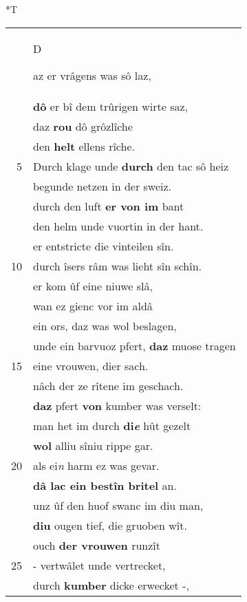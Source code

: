 \documentclass[8pt,a4paper,notitlepage]{article}
\begin{document}
\begin{table}[ht]
\begin{minipage}[t]{0.5\linewidth}
\end{minipage}
\hspace{0.5cm}
\begin{minipage}[t]{0.5\linewidth}
\small
\begin{center}*T
\end{center}
\begin{tabular}{rl}
 & \begin{large}D\end{large}az er vrâgens was sô laz,\\ 
 & \textbf{dô} er bî dem trûrigen wirte saz,\\ 
 & daz \textbf{rou} dô grôzlîche\\ 
 & den \textbf{helt} ellens rîche.\\ 
5 & Durch klage unde \textbf{durch} den tac sô heiz\\ 
 & begunde netzen in der sweiz.\\ 
 & durch den luft \textbf{er von im} bant\\ 
 & den helm unde vuortin in der hant.\\ 
 & er entstricte die vinteilen sîn.\\ 
10 & durch îsers râm was lieht sîn schîn.\\ 
 & er kom ûf eine niuwe slâ,\\ 
 & wan ez gienc vor im aldâ\\ 
 & ein ors, daz was wol beslagen,\\ 
 & unde ein barvuoz pfert, \textbf{daz} muose tragen\\ 
15 & eine vrouwen, dier sach.\\ 
 & nâch der ze rîtene im geschach.\\ 
 & \textbf{daz} pfert \textbf{von} kumber was verselt:\\ 
 & man het im durch \textbf{di\textit{e}} hût gezelt\\ 
 & \textbf{wol} alliu sîniu rippe gar.\\ 
20 & als ei\textit{n} harm ez was gevar.\\ 
 & \textbf{dâ lac ein bestîn britel} an.\\ 
 & unz ûf den huof swanc im diu man,\\ 
 & \textbf{diu} ougen tief, die gruoben wît.\\ 
 & ouch \textbf{der vrouwen} runzît\\ 
25 & - vertwâlet unde vertrecket,\\ 
 & durch \textbf{kumber} dicke erwecket -,\\ 

\end{tabular}
\end{minipage}
\end{table}
\end{document}
